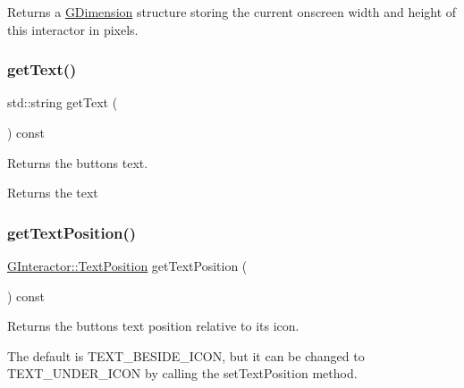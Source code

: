 Returns a \mbox{\hyperlink{classGDimension}{G\+Dimension}} structure storing the current onscreen width and height of this interactor in pixels. 

\mbox{\label{classGButton_aff553c50924b836c29f146ed34a7c6ec}} 
\subsubsection{\texorpdfstring{get\+Text()}{getText()}}
{\footnotesize\ttfamily std\+::string get\+Text (\begin{DoxyParamCaption}{ }\end{DoxyParamCaption}) const\hspace{0.3cm}{\ttfamily [virtual]}}



Returns the button\textquotesingle{}s text. 

\begin{DoxyReturn}{Returns}
the text 
\end{DoxyReturn}
\mbox{\label{classGButton_a3fc623df3ced62aca93fc344c2426899}} 
\subsubsection{\texorpdfstring{get\+Text\+Position()}{getTextPosition()}}
{\footnotesize\ttfamily \mbox{\hyperlink{classGInteractor_a8e0d441725a81d2bbdebbea09078260e}{G\+Interactor\+::\+Text\+Position}} get\+Text\+Position (\begin{DoxyParamCaption}{ }\end{DoxyParamCaption}) const\hspace{0.3cm}{\ttfamily [virtual]}}



Returns the button\textquotesingle{}s text position relative to its icon. 

The default is T\+E\+X\+T\+\_\+\+B\+E\+S\+I\+D\+E\+\_\+\+I\+C\+ON, but it can be changed to T\+E\+X\+T\+\_\+\+U\+N\+D\+E\+R\+\_\+\+I\+C\+ON by calling the set\+Text\+Position method. \mbox{\label{classGButton_a9896d58fcfebbf1025aeeb5b8b9ede80}} 
